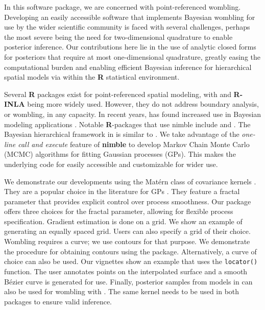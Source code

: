In this software package, we are concerned with point-referenced wombling. Developing an easily accessible software that implements Bayesian wombling for use by the wider scientific community is faced with several challenges, perhaps the most severe being the need for two-dimensional quadrature to enable posterior inference. Our contributions here lie in the use of analytic closed forms for posteriors that require at most one-dimensional quadrature, greatly easing the computational burden and enabling efficient Bayesian inference for hierarchical spatial models \citep[see, e.g.][]{banerjee_hierarchical_2014} via  \cite[][]{de_valpine_programming_2017} within the {\bf R} \cite[][]{r_core_team_2021} statistical environment.

Several {\bf R} packages exist for point-referenced spatial modeling, with  \cite[][]{finley_spbayes_2007} and {\bf R-INLA} \cite[][]{lindgren_bayesian_2015} being more widely used. However, they do not address boundary analysis, or wombling, in any capacity. In recent years,  has found increased use in Bayesian modeling applications \citep[see, e.g.][]{turek_efficient_2016,ponisio_one_2020,goldstein_comparing_2022}. Notable {\bf R}-packages that use nimble include  \cite[][]{risser_bayesian_2020} and  \cite[][]{nimbleEcology_2024}. The Bayesian hierarchical %
framework in  is similar to . We take advantage of the \emph{one-line call and execute} feature of {\bf nimble} to develop Markov Chain Monte Carlo (MCMC) algorithms for fitting Gaussian processes (GPs). This makes the underlying code for  easily accessible and customizable for wider use. 

We demonstrate our developments using the Mat\'ern class of covariance kernels \cite[see, e.g.,][]{abramowitz1988handbook}. They are a popular choice in the literature for GPs \citep[see, e.g.,][]{rasmussen_gaussian_2005}. They feature a fractal parameter that provides explicit control over process smoothness. Our package offers three choices for the fractal parameter, allowing for flexible process specification. Gradient estimation is done on a grid. We show an example of generating an equally spaced grid. Users can also specify a grid of their choice. Wombling requires a curve; we use contours for that purpose. We demonstrate the procedure for obtaining contours using the  package. Alternatively, a curve of choice can also be used. Our vignettes show an example that uses the \texttt{locator()} function. The user annotates points on the interpolated surface and a smooth B\'ezier curve is generated for use. Finally, posterior samples from models in  can also be used for wombling with . The same kernel needs to be used in both packages to ensure valid inference. 

